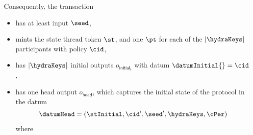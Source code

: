 \noindent Consequently, the \mtxInit{} transaction
\begin{itemize}
	\item has at least input $\seed$,
	\item mints the state thread token $\st$, and one $\pt$ for each of the $|\hydraKeys|$
	      participants with policy $\cid$,
	\item has $|\hydraKeys|$ initial outputs $o_{\mathsf{initial}_{i}}$ with datum $\datumInitial{} = \cid$,
	\item has one head output
	      $o_{\mathsf{head}}$, which captures
	      the initial state of the protocol in the datum
	      \[
		      \datumHead = (\stInitial,\cid',\seed',\hydraKeys,\cPer)
	      \]
	      where
\end{itemize}

